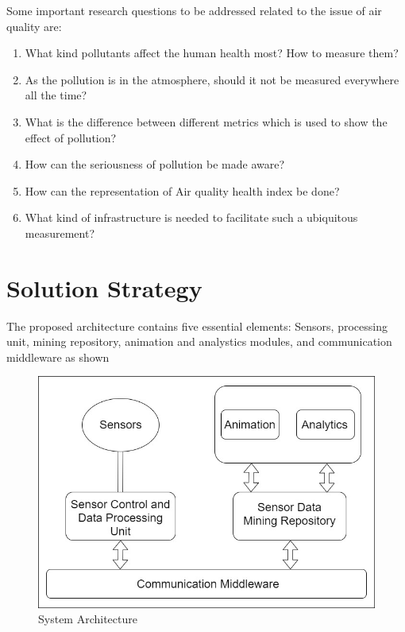 \documentclass[11pt]{article}
\begin{document}
 Some important research questions to be addressed related to the issue of air quality are: 
 \begin{enumerate}
 
 \item What kind pollutants affect the human health most? How to measure them?
 
  \item  As the pollution is in the atmosphere, should it not be measured everywhere all the time? 
  
   \item What is the difference between different metrics which is used to show the effect of pollution?
  
 \item How can the seriousness of pollution be made aware?
 
 \item How can the representation of Air quality health index be done?

 \item  What kind of infrastructure is needed to facilitate such a ubiquitous measurement?
 
 

 
 \end{enumerate}
 


\section{Solution Strategy}
The proposed architecture contains five essential elements: Sensors, processing unit, mining repository, animation and analystics modules, and communication middleware as shown
\begin{figure}[h!]
  \centering
  \hspace*{-1.25cm}   
\includegraphics[scale=0.34]{images/fig5.jpg}
  \hspace*{-1.25cm}
  \caption{System Architecture}
  \label{arch}
\end{figure}
\end{document}
